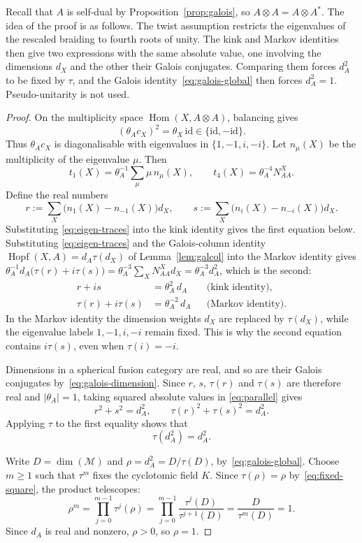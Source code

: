 \documentclass[11pt,oneside]{amsart}
\theoremstyle{remark}
\newcommand{\M}{\mathcal M}
\newcommand{\Hom}{\operatorname{Hom}}
\newcommand{\Hopf}{\operatorname{Hopf}}
\begin{document}
Recall that $A$ is self-dual by Proposition~\ref{prop:galois}, so
$A\otimes A=A\otimes A^*$. The idea of the proof is as follows. The twist
assumption restricts the eigenvalues of the rescaled braiding to fourth roots of
unity. The kink and Markov identities then give two expressions with the same
absolute value, one involving the dimensions $d_X$ and the other their Galois
conjugates. Comparing them forces $d_A^2$ to be fixed by $\tau$, and the Galois
identity~\eqref{eq:galois-global} then forces $d_A^2=1$. Pseudo-unitarity is not
used.

\begin{proof}
On the multiplicity space $\Hom(X,A\otimes A)$, balancing gives
\[
(\theta_Ac_X)^2=\theta_X\,\mathrm{id}\in\{\mathrm{id},-\mathrm{id}\}.
\]
Thus $\theta_Ac_X$ is diagonalisable with eigenvalues in $\{1,-1,i,-i\}$.
Let $n_\mu(X)$ be the multiplicity of the eigenvalue $\mu$. Then
\begin{equation}\label{eq:eigen-traces}
t_1(X)=\theta_A^{-1}\sum_\mu\mu\,n_\mu(X),\qquad
t_4(X)=\theta_A^{-4}N_{AA}^X.
\end{equation}
Define the real numbers
\[
r:=\sum_X\bigl(n_1(X)-n_{-1}(X)\bigr)d_X,\qquad
s:=\sum_X\bigl(n_i(X)-n_{-i}(X)\bigr)d_X.
\]
Substituting \eqref{eq:eigen-traces} into the kink identity gives the first
equation below. Substituting \eqref{eq:eigen-traces} and the Galois-column
identity $\Hopf(X,A)=d_A\tau(d_X)$ of Lemma~\ref{lem:galcol} into the Markov
identity gives
$\theta_A^{-1}d_A\bigl(\tau(r)+i\tau(s)\bigr)=\theta_A^{-3}\sum_XN_{AA}^Xd_X
=\theta_A^{-3}d_A^2$, which is the second:
\begin{equation}\label{eq:parallel}
\begin{aligned}
r+is&=\theta_A^2\,d_A&&\text{(kink identity)},\\
\tau(r)+i\tau(s)&=\theta_A^{-2}\,d_A&&\text{(Markov identity)}.
\end{aligned}
\end{equation}
In the Markov identity the dimension weights $d_X$ are replaced by
$\tau(d_X)$, while the eigenvalue labels $1,-1,i,-i$ remain fixed. This is why
the second equation contains $i\tau(s)$, even when $\tau(i)=-i$.

Dimensions in a spherical fusion category are real, and so are their Galois
conjugates by~\eqref{eq:galois-dimension}. Since $r$, $s$, $\tau(r)$ and
$\tau(s)$ are therefore real and $|\theta_A|=1$, taking
squared absolute values in \eqref{eq:parallel} gives
\[
r^2+s^2=d_A^2,\qquad \tau(r)^2+\tau(s)^2=d_A^2.
\]
Applying $\tau$ to the first equality shows that
\begin{equation}\label{eq:fixed-square}
\tau(d_A^2)=d_A^2.
\end{equation}

Write $D=\dim(\M)$ and $\rho=d_A^2=D/\tau(D)$, by~\eqref{eq:galois-global}.
Choose $m\ge1$ such that $\tau^m$ fixes the cyclotomic field $K$. Since
$\tau(\rho)=\rho$ by~\eqref{eq:fixed-square}, the product telescopes:
\[
\rho^m=\prod_{j=0}^{m-1}\tau^j(\rho)
=\prod_{j=0}^{m-1}\frac{\tau^j(D)}{\tau^{j+1}(D)}
=\frac{D}{\tau^m(D)}=1.
\]
Since $d_A$ is real and nonzero, $\rho>0$, so $\rho=1$.
\end{proof}
\end{document}
